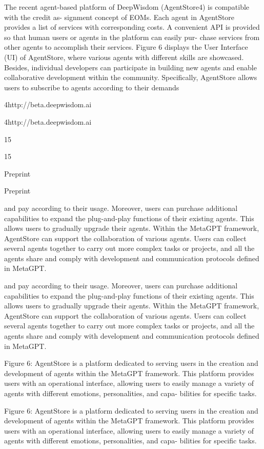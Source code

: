 \documentclass[12pt]{article}
\begin{document}
The recent agent-based platform of DeepWisdom (AgentStore4) is compatible with the credit as-
signment concept of EOMs. Each agent in AgentStore provides a list of services with corresponding
costs. A convenient API is provided so that human users or agents in the platform can easily pur-
chase services from other agents to accomplish their services. Figure 6 displays the User Interface
(UI) of AgentStore, where various agents with different skills are showcased. Besides, individual
developers can participate in building new agents and enable collaborative development within the
community. Specifically, AgentStore allows users to subscribe to agents according to their demands


4http://beta.deepwisdom.ai


4http://beta.deepwisdom.ai


15


15


Preprint


Preprint


and pay according to their usage. Moreover, users can purchase additional capabilities to expand the
plug-and-play functions of their existing agents. This allows users to gradually upgrade their agents.
Within the MetaGPT framework, AgentStore can support the collaboration of various agents. Users
can collect several agents together to carry out more complex tasks or projects, and all the agents
share and comply with development and communication protocols defined in MetaGPT.


and pay according to their usage. Moreover, users can purchase additional capabilities to expand the
plug-and-play functions of their existing agents. This allows users to gradually upgrade their agents.
Within the MetaGPT framework, AgentStore can support the collaboration of various agents. Users
can collect several agents together to carry out more complex tasks or projects, and all the agents
share and comply with development and communication protocols defined in MetaGPT.


Figure 6: AgentStore is a platform dedicated to serving users in the creation and development of
agents within the MetaGPT framework. This platform provides users with an operational interface,
allowing users to easily manage a variety of agents with different emotions, personalities, and capa-
bilities for specific tasks.


Figure 6: AgentStore is a platform dedicated to serving users in the creation and development of
agents within the MetaGPT framework. This platform provides users with an operational interface,
allowing users to easily manage a variety of agents with different emotions, personalities, and capa-
bilities for specific tasks.
\end{document}
